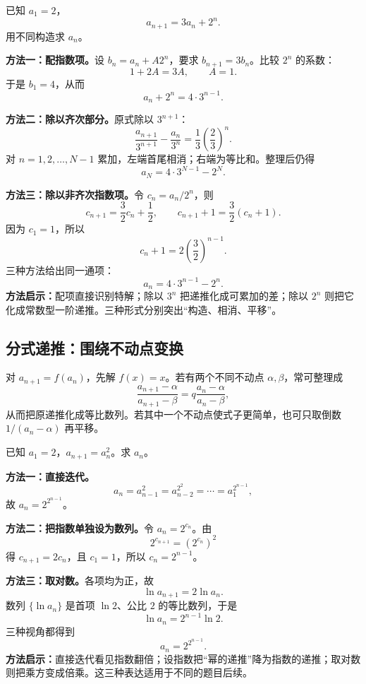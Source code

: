 \begin{examplebox}
  已知 $a_1=2$，
  \[
    a_{n+1}=3a_n+2^n.
  \]
  用不同构造求 $a_n$。

  \textbf{方法一：配指数项。}设 $b_n=a_n+A2^n$，要求 $b_{n+1}=3b_n$。比较 $2^n$ 的系数：
  \[
    1+2A=3A,\qquad A=1.
  \]
  于是 $b_1=4$，从而
  \[
    a_n+2^n=4\cdot3^{n-1}.
  \]

  \textbf{方法二：除以齐次部分。}原式除以 $3^{n+1}$：
  \[
    \frac{a_{n+1}}{3^{n+1}}-\frac{a_n}{3^n}
      =\frac13\left(\frac23\right)^n.
  \]
  对 $n=1,2,\ldots,N-1$ 累加，左端首尾相消；右端为等比和。整理后仍得
  \[
    a_N=4\cdot3^{N-1}-2^N.
  \]

  \textbf{方法三：除以非齐次指数项。}令 $c_n=a_n/2^n$，则
  \[
    c_{n+1}=\frac32c_n+\frac12,\qquad
    c_{n+1}+1=\frac32(c_n+1).
  \]
  因为 $c_1=1$，所以
  \[
    c_n+1=2\left(\frac32\right)^{n-1}.
  \]
  三种方法给出同一通项：
  \[
    \boxed{a_n=4\cdot3^{n-1}-2^n}.
  \]
  \textbf{方法启示：}配项直接识别特解；除以 $3^n$ 把递推化成可累加的差；除以 $2^n$ 则把它化成常数型一阶递推。三种形式分别突出“构造、相消、平移”。
\end{examplebox}

\subsection{分式递推：围绕不动点变换}

\begin{lawbox}[分式递推的不动点法]
  对 $a_{n+1}=f(a_n)$，先解 $f(x)=x$。若有两个不同不动点 $\alpha,\beta$，常可整理成
  \[
    \frac{a_{n+1}-\alpha}{a_{n+1}-\beta}
      =q\frac{a_n-\alpha}{a_n-\beta},
  \]
  从而把原递推化成等比数列。若其中一个不动点使式子更简单，也可只取倒数 $1/(a_n-\alpha)$ 再平移。
\end{lawbox}

\begin{examplebox}
  已知 $a_1=2$，$a_{n+1}=a_n^2$。求 $a_n$。

  \textbf{方法一：直接迭代。}
  \[
    a_n=a_{n-1}^2=a_{n-2}^{2^2}=\cdots=a_1^{2^{n-1}},
  \]
  故 $a_n=2^{2^{n-1}}$。

  \textbf{方法二：把指数单独设为数列。}令 $a_n=2^{c_n}$。由
  \[
    2^{c_{n+1}}=(2^{c_n})^2
  \]
  得 $c_{n+1}=2c_n$，且 $c_1=1$，所以 $c_n=2^{n-1}$。

  \textbf{方法三：取对数。}各项均为正，故
  \[
    \ln a_{n+1}=2\ln a_n.
  \]
  数列 $\{\ln a_n\}$ 是首项 $\ln2$、公比 $2$ 的等比数列，于是
  \[
    \ln a_n=2^{n-1}\ln2.
  \]
  三种视角都得到
  \[
    \boxed{a_n=2^{2^{n-1}}}.
  \]
  \textbf{方法启示：}直接迭代看见指数翻倍；设指数把“幂的递推”降为指数的递推；取对数则把乘方变成倍乘。这三种表达适用于不同的题目后续。
\end{examplebox}

